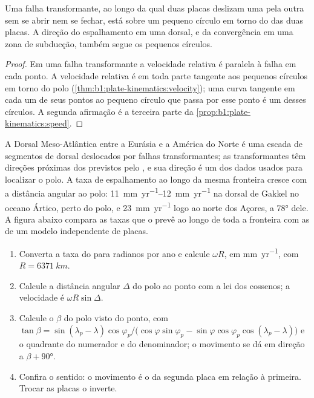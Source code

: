 \begin{proposition}\label{prop:b1:plate-kinematics:transforms}
Uma falha transformante, ao longo da qual duas placas deslizam uma pela outra sem
se abrir nem se fechar, está sobre um pequeno círculo em torno do  das
duas placas. A direção do espalhamento em uma dorsal, e da convergência em uma
zona de subducção, também segue os pequenos círculos.
\end{proposition}

\begin{proof}
Em uma falha transformante a velocidade relativa é paralela à falha em cada
ponto. A velocidade relativa é em toda parte tangente aos pequenos círculos em torno do
polo (\cref{thm:b1:plate-kinematics:velocity}); uma curva tangente em cada um de seus
pontos ao pequeno círculo que passa por esse ponto é um desses círculos. A
segunda afirmação é a terceira parte da \cref{prop:b1:plate-kinematics:speed}.
\end{proof}

A Dorsal Meso-Atlântica entre a Eurásia e a América do Norte é uma escada de
segmentos de dorsal deslocados por falhas transformantes; as transformantes têm direções próximas dos
 previstos pelo , e sua direção é um dos dados usados para
localizar o polo. A taxa de espalhamento ao longo da mesma fronteira cresce com a
distância angular ao polo: \qtyrange{11}{12}{mm.yr^{-1}} na dorsal de Gakkel
no oceano Ártico, perto do polo, e \qty{23}{mm.yr^{-1}} logo ao norte
dos Açores, a \ang{78} dele. A figura abaixo compara as taxas que o 
prevê ao longo de toda a fronteira com as de um modelo independente de placas.

\begin{method}\label{met:b1:plate-kinematics:velocity}
\begin{enumerate}
  \item Converta a taxa do  para radianos por ano e calcule
        $\omega R$, em \unit{mm.yr^{-1}}, com $R = \qty{6371}{km}$.
  \item Calcule a distância angular $\Delta$ do polo ao ponto com a
        lei dos cossenos; a velocidade é $\omega R\sin\Delta$.
  \item Calcule o  $\beta$ do polo visto do ponto, com
        $\tan\beta = \sin(\lambda_p - \lambda)\cos\varphi_p /
        \bigl(\cos\varphi\sin\varphi_p - \sin\varphi\cos\varphi_p
        \cos(\lambda_p - \lambda)\bigr)$ e o quadrante do numerador e do
        denominador; o movimento se dá em direção a $\beta + \ang{90}$.
  \item Confira o sentido: o movimento é o da segunda placa em relação à primeira.
        Trocar as placas o inverte.
\end{enumerate}
\end{method}

